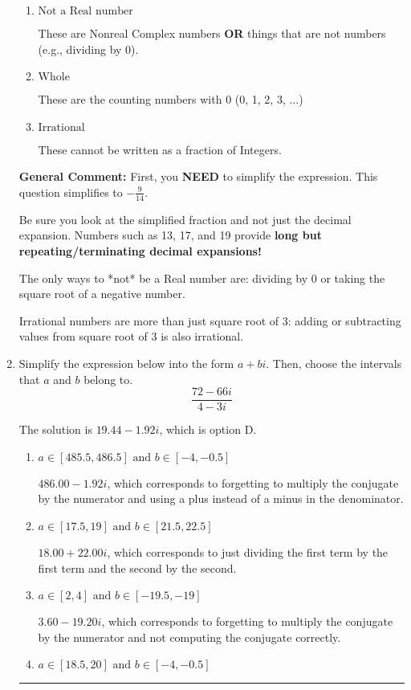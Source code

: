 \documentclass{extbook}[14pt]
\newcommand{\litem}[1]{\item #1

\rule{\textwidth}{0.4pt}}
\begin{document}
\begin{enumerate}
{\begin{enumerate}[label=\Alph*.]
* This is the correct option!
\item \( \text{Not a Real number} \)

These are Nonreal Complex numbers \textbf{OR} things that are not numbers (e.g., dividing by 0).
\item \( \text{Whole} \)

These are the counting numbers with 0 (0, 1, 2, 3, ...)
\item \( \text{Irrational} \)

These cannot be written as a fraction of Integers.
\end{enumerate}

\textbf{General Comment:} First, you \textbf{NEED} to simplify the expression. This question simplifies to $-\frac{9}{14}$. 
 
 Be sure you look at the simplified fraction and not just the decimal expansion. Numbers such as 13, 17, and 19 provide \textbf{long but repeating/terminating decimal expansions!} 
 
 The only ways to *not* be a Real number are: dividing by 0 or taking the square root of a negative number. 
 
 Irrational numbers are more than just square root of 3: adding or subtracting values from square root of 3 is also irrational.
}
\litem{
Simplify the expression below into the form $a+bi$. Then, choose the intervals that $a$ and $b$ belong to.
\[ \frac{72 - 66 i}{4 - 3 i} \]

The solution is \( 19.44  - 1.92 i \), which is option D.\begin{enumerate}[label=\Alph*.]
\item \( a \in [485.5, 486.5] \text{ and } b \in [-4, -0.5] \)

 $486.00  - 1.92 i$, which corresponds to forgetting to multiply the conjugate by the numerator and using a plus instead of a minus in the denominator.
\item \( a \in [17.5, 19] \text{ and } b \in [21.5, 22.5] \)

 $18.00  + 22.00 i$, which corresponds to just dividing the first term by the first term and the second by the second.
\item \( a \in [2, 4] \text{ and } b \in [-19.5, -19] \)

 $3.60  - 19.20 i$, which corresponds to forgetting to multiply the conjugate by the numerator and not computing the conjugate correctly.
\item \( a \in [18.5, 20] \text{ and } b \in [-4, -0.5] \)


\end{enumerate}}
\end{enumerate}
\end{document}
